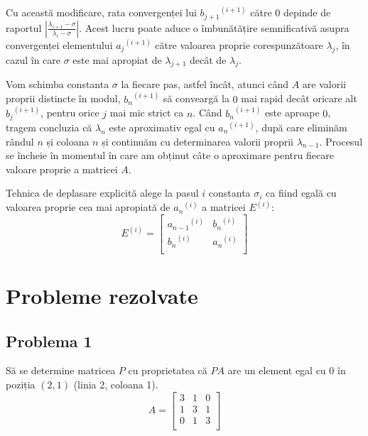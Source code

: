 \documentclass{exam}
\begin{document}
Cu această modificare, rata convergenței lui ${b_{j+1}}^{(i+1)}$ către $0$ depinde de raportul $\left|\frac{\lambda_{i+1}-\sigma}{\lambda_{i}-\sigma}\right|$. Acest lucru poate aduce o îmbunătățire semnificativă asupra convergenței elementului ${a_{j}}^{(i+1)}$ către valoarea proprie corespunzătoare $\lambda_{j}$, în cazul în care $\sigma$ este mai apropiat de $\lambda_{j+1}$ decât de $\lambda_{j}$.

Vom schimba constanta $\sigma$ la fiecare pas, astfel încât, atunci când $A$ are valorii proprii distincte în modul, ${b_{n}}^{(i+1)}$ să conveargă la $0$ mai rapid decât oricare alt ${b_{j}}^{(i+1)}$, pentru orice $j$ mai mic strict ca $n$.
Când ${b_{n}}^{(i+1)}$ este aproape $0$, tragem concluzia că $\lambda_{n}$ este aproximativ egal cu ${a_{n}}^{(i+1)}$, după care eliminăm rândul $n$ și coloana $n$ și continuăm cu determinarea valorii proprii $\lambda_{n-1}$. Procesul se încheie în momentul în care am obținut câte o aproximare pentru fiecare valoare proprie a matricei $A$.

Tehnica de deplasare explicită alege la pasul $i$ constanta $\sigma_{i}$ ca fiind egală cu valoarea proprie cea mai apropiată de ${a_{n}}^{(i)}$ a matricei $E^{(i)}$:
$$E^{(i)} = \begin{bmatrix}
		{a_{n-1}}^{(i)} & {b_{n}}^{(i)} \\
		{b_{n}}^{(i)}   & {a_{n}}^{(i)} \\
	\end{bmatrix}$$


\section{Probleme rezolvate}

\subsection{Problema  1}

Să se determine matricea $P$ cu proprietatea că $PA$ are un element egal cu $0$ în poziția $(2,1)$
(linia 2, coloana 1).
$$A = \begin{bmatrix}
		3 & 1 & 0 \\
		1 & 3 & 1 \\
		0 & 1 & 3 \\
	\end{bmatrix}$$
\end{document}
